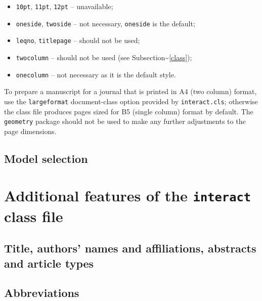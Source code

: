 \documentclass[]{interact}
\theoremstyle{plain}%
\theoremstyle{definition}
\theoremstyle{remark}
\def\tightlist{}
\begin{document}
\begin{itemize}
\tightlist
\item
  \texttt{10pt}, \texttt{11pt}, \texttt{12pt} -- unavailable;
\item
  \texttt{oneside}, \texttt{twoside} -- not necessary, \texttt{oneside}
  is the default;
\item
  \texttt{leqno}, \texttt{titlepage} -- should not be used;
\item
  \texttt{twocolumn} -- should not be used (see
  Subsection\textasciitilde{}\ref{class});
\item
  \texttt{onecolumn} -- not necessary as it is the default style.
\end{itemize}

To prepare a manuscript for a journal that is printed in A4 (two column)
format, use the \texttt{largeformat} document-class option provided by
\texttt{interact.cls}; otherwise the class file produces pages sized for
B5 (single column) format by default. The \texttt{geometry} package
should not be used to make any further adjustments to the page
dimensions.

\hypertarget{model-selection}{%
\subsection{Model selection}\label{model-selection}}

\hypertarget{additional-features-of-the-interact-class-file}{%
\section{\texorpdfstring{Additional features of the \texttt{interact}
class
file}{Additional features of the interact class file}}\label{additional-features-of-the-interact-class-file}}

\hypertarget{title-authors-names-and-affiliations-abstracts-and-article-types}{%
\subsection{Title, authors' names and affiliations, abstracts and
article
types}\label{title-authors-names-and-affiliations-abstracts-and-article-types}}

\hypertarget{abbreviations}{%
\subsection{Abbreviations}\label{abbreviations}}
\end{document}
